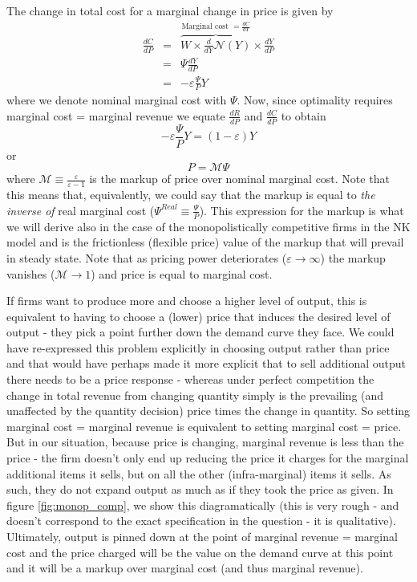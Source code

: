 \documentclass[authoryear,11pt]{elsarticle}
\begin{document}
The change in total cost for a marginal change in price is given by
\begin{eqnarray*}
\frac{dC}{dP} 	&=& \overbrace{W \times \frac{d}{dY}\mathcal{N}(Y)}^{\text{Marginal cost $=\frac{dC}{dY}$}} \times  \frac{dY}{dP} \\
			 	&=& \Psi \frac{dY}{dP} \\
			 	&=& -\varepsilon \frac{\Psi}{P} Y
\end{eqnarray*}
where we denote nominal marginal cost with $\Psi$. Now, since optimality requires marginal cost = marginal revenue we equate $\frac{dR}{dP}$ and $\frac{dC}{dP}$ to obtain
\[
-\varepsilon \frac{\Psi}{P} Y =  (1-\varepsilon)Y
\]
or
\[
P = \mathcal{M} \Psi
\]
where $\mathcal{M}\equiv\frac{\varepsilon}{\varepsilon-1}$ is the markup of price over nominal marginal cost. Note that this means that, equivalently, we could say that the markup is equal to \emph{the inverse of} real marginal cost ($\Psi^{Real} \equiv \frac{\Psi}{P}$). This expression for the markup is what we will derive also in the case of the monopolistically competitive firms in the NK model and is the frictionless (flexible price) value of the markup that will prevail in steady state. Note that as pricing power deteriorates ($\varepsilon \to \infty$) the markup vanishes ($\mathcal{M} \to 1$) and price is equal to marginal cost.

If firms want to produce more and choose a higher level of output, this is equivalent to having to choose a (lower) price that induces the desired level of output - they pick a point further down the demand curve they face. We could have re-expressed this problem explicitly in choosing output rather than price and that would have perhaps made it more explicit that to sell additional output there needs to be a price response - whereas under perfect competition the change in total revenue from changing quantity simply is the prevailing (and unaffected by the quantity decision) price times the change in quantity. So setting marginal cost = marginal revenue is equivalent to setting marginal cost = price. But in our situation, because price is changing, marginal revenue is less than the price - the firm doesn't only end up reducing the price it charges for the marginal additional items it sells, but on all the other (infra-marginal) items it sells. As such, they do not expand output as much as if they took the price as given. In figure \ref{fig:monop_comp}, we show this diagramatically (this is very rough - and doesn't correspond to the exact specification in the question - it is qualitative). Ultimately, output is pinned down at the point of marginal revenue = marginal cost and the price charged will be the value on the demand curve at this point and it will be a markup over marginal cost (and thus marginal revenue).
\end{document}
